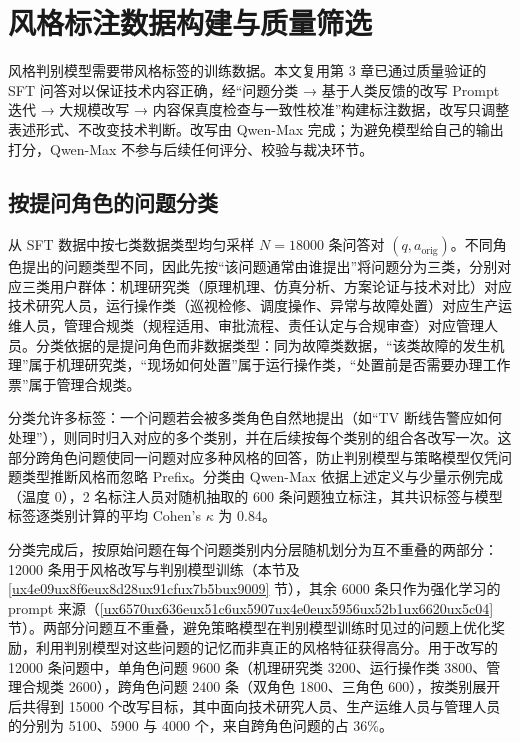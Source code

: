 \documentclass[fontset=fandol,type=master,campus=shenzhen,etitleauto=true]{hithesisbook}
\begin{document}
\section{风格标注数据构建与质量筛选}\label{ux98ceux683cux504fux597dux6570ux636eux6784ux5efaux4e0e-llm-as-judge-ux7b5bux9009}

风格判别模型需要带风格标签的训练数据。本文复用第 3 章已通过质量验证的 SFT 问答对以保证技术内容正确，经“问题分类 → 基于人类反馈的改写 Prompt 迭代 → 大规模改写 → 内容保真度检查与一致性校准”构建标注数据，改写只调整表述形式、不改变技术判断。改写由 Qwen-Max 完成；为避免模型给自己的输出打分，Qwen-Max 不参与后续任何评分、校验与裁决环节。

\subsection{按提问角色的问题分类}\label{subsec:question-classify}

从 SFT 数据中按七类数据类型均匀采样 $N = 18000$ 条问答对 $(q, a_{\text{orig}})$。不同角色提出的问题类型不同，因此先按“该问题通常由谁提出”将问题分为三类，分别对应三类用户群体：机理研究类（原理机理、仿真分析、方案论证与技术对比）对应技术研究人员，运行操作类（巡视检修、调度操作、异常与故障处置）对应生产运维人员，管理合规类（规程适用、审批流程、责任认定与合规审查）对应管理人员。分类依据的是提问角色而非数据类型：同为故障类数据，“该类故障的发生机理”属于机理研究类，“现场如何处置”属于运行操作类，“处置前是否需要办理工作票”属于管理合规类。

分类允许多标签：一个问题若会被多类角色自然地提出（如“TV 断线告警应如何处理”），则同时归入对应的多个类别，并在后续按每个类别的组合各改写一次。这部分跨角色问题使同一问题对应多种风格的回答，防止判别模型与策略模型仅凭问题类型推断风格而忽略 Prefix。分类由 Qwen-Max 依据上述定义与少量示例完成（温度 0），2 名标注人员对随机抽取的 600 条问题独立标注，其共识标签与模型标签逐类别计算的平均 Cohen's $\kappa$ 为 0.84。

分类完成后，按原始问题在每个问题类别内分层随机划分为互不重叠的两部分：12000 条用于风格改写与判别模型训练（本节及 \ref{ux4e09ux8f6eux8d28ux91cfux7b5bux9009} 节），其余 6000 条只作为强化学习的 prompt 来源（\ref{ux6570ux636eux51c6ux5907ux4e0eux5956ux52b1ux6620ux5c04} 节）。两部分问题互不重叠，避免策略模型在判别模型训练时见过的问题上优化奖励，利用判别模型对这些问题的记忆而非真正的风格特征获得高分。用于改写的 12000 条问题中，单角色问题 9600 条（机理研究类 3200、运行操作类 3800、管理合规类 2600），跨角色问题 2400 条（双角色 1800、三角色 600），按类别展开后共得到 15000 个改写目标，其中面向技术研究人员、生产运维人员与管理人员的分别为 5100、5900 与 4000 个，来自跨角色问题的占 36\%。
\end{document}
